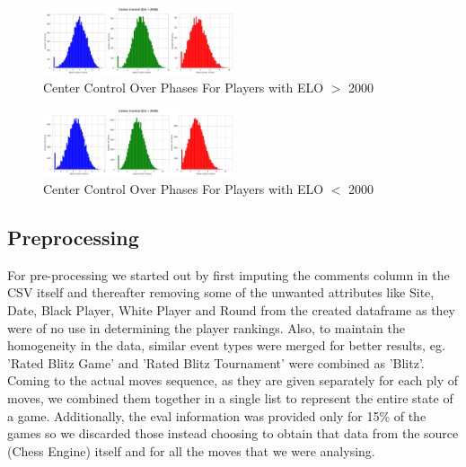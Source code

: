 \documentclass[11pt,a4paper]{article}
\begin{document}
\begin{enumerate}[(i)]
    \begin{figure}[!ht]
      \centering
        \includegraphics[width=0.5\textwidth]{GT2k_CC.png}
        \caption{Center Control Over Phases For Players with ELO $>$ 2000}
    \end{figure}
    
    \begin{figure}[!ht]
      \centering
        \includegraphics[width=0.5\textwidth]{LT2k_CC.png}
        \caption{Center Control Over Phases For Players with ELO $<$ 2000}
    \end{figure}
\end{enumerate}
\subsection{Preprocessing}
For pre-processing we started out by first imputing the comments column in the CSV itself and thereafter removing some of the unwanted attributes like Site, Date, Black Player, White Player and Round from the created dataframe as they were of no use in determining the player rankings. Also, to maintain the homogeneity in the data, similar event types were merged for better results, eg. 'Rated Blitz Game' and 'Rated Blitz Tournament' were combined as 'Blitz'. Coming to the actual moves sequence, as they are given separately for each ply of moves, we combined them together in a single list to represent the entire state of a game. Additionally, the eval information was provided only for 15\% of the games so we discarded those instead choosing to obtain that data from the source (Chess Engine) itself and for all the moves that we were analysing.
\end{document}
